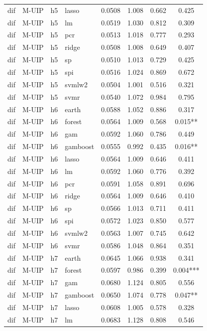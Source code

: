 \begin{ThreePartTable}
\begin{longtable}[t]{llclcccc}
dif & M-UIP & h5 & lasso & 0.0508 & 1.008 & 0.662 & 0.425\\
dif & M-UIP & h5 & lm & 0.0519 & 1.030 & 0.812 & 0.309\\
dif & M-UIP & h5 & pcr & 0.0513 & 1.018 & 0.777 & 0.293\\
dif & M-UIP & h5 & ridge & 0.0508 & 1.008 & 0.649 & 0.407\\
dif & M-UIP & h5 & sp & 0.0510 & 1.013 & 0.729 & 0.425\\
dif & M-UIP & h5 & spi & 0.0516 & 1.024 & 0.869 & 0.672\\
dif & M-UIP & h5 & svmlw2 & 0.0504 & 1.001 & 0.516 & 0.321\\
dif & M-UIP & h5 & svmr & 0.0540 & 1.072 & 0.984 & 0.795\\
\addlinespace
dif & M-UIP & h6 & earth & 0.0588 & 1.052 & 0.886 & 0.317\\
dif & M-UIP & h6 & forest & 0.0564 & 1.009 & 0.568 & 0.015**\\
dif & M-UIP & h6 & gam & 0.0592 & 1.060 & 0.786 & 0.449\\
dif & M-UIP & h6 & gamboost & 0.0555 & 0.992 & 0.435 & 0.016**\\
dif & M-UIP & h6 & lasso & 0.0564 & 1.009 & 0.646 & 0.411\\
dif & M-UIP & h6 & lm & 0.0592 & 1.060 & 0.776 & 0.392\\
dif & M-UIP & h6 & pcr & 0.0591 & 1.058 & 0.891 & 0.696\\
dif & M-UIP & h6 & ridge & 0.0564 & 1.009 & 0.646 & 0.410\\
dif & M-UIP & h6 & sp & 0.0566 & 1.013 & 0.711 & 0.411\\
dif & M-UIP & h6 & spi & 0.0572 & 1.023 & 0.850 & 0.577\\
dif & M-UIP & h6 & svmlw2 & 0.0563 & 1.007 & 0.745 & 0.642\\
dif & M-UIP & h6 & svmr & 0.0586 & 1.048 & 0.864 & 0.351\\
\addlinespace
dif & M-UIP & h7 & earth & 0.0645 & 1.066 & 0.938 & 0.341\\
dif & M-UIP & h7 & forest & 0.0597 & 0.986 & 0.399 & 0.004***\\
dif & M-UIP & h7 & gam & 0.0680 & 1.124 & 0.805 & 0.556\\
dif & M-UIP & h7 & gamboost & 0.0650 & 1.074 & 0.778 & 0.047**\\
dif & M-UIP & h7 & lasso & 0.0608 & 1.005 & 0.578 & 0.328\\
dif & M-UIP & h7 & lm & 0.0683 & 1.128 & 0.808 & 0.546\\

\end{longtable}
\end{ThreePartTable}
